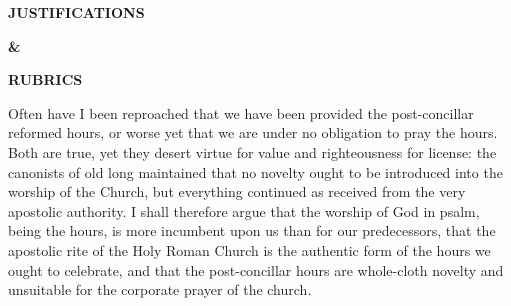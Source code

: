
 \usepackage{lscape}
 \usepackage{longtable}
 \usepackage{arydshln}
 


	\begin{titlepage}
		\vspace*{\fill}
		
		\begin{center}
			
			\textbf{\Huge\color{black} JUSTIFICATIONS}
			
			\textbf{\Huge\color{black} \&}
			
			\textbf{\Huge\color{black} RUBRICS}
			
		\end{center}
		
		\vspace*{\fill}
	\end{titlepage}
	
	
	
	\raggedbottom
	
	
	
	\raggedbottom
	
	
		Often have I been reproached that we have been provided the post-concillar reformed hours, or worse yet that we are under no obligation to pray the hours. Both are true, yet they desert virtue for value and righteousness for license: the canonists of old long maintained that no novelty ought to be introduced into the worship of the Church, but everything continued as received from the very apostolic authority. I shall therefore argue that the worship of God in psalm, being the hours, is more incumbent upon us than for our predecessors, that the apostolic rite of the Holy Roman Church is the authentic form of the hours we ought to celebrate, and that the post-concillar hours are whole-cloth novelty and unsuitable for the corporate prayer of the church.
		
